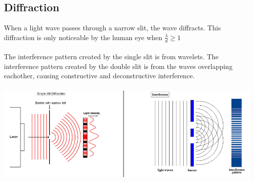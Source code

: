\documentclass{article}
\begin{document}
\subsection{Diffraction}
When a light wave passes through a narrow slit, the wave diffracts. This diffraction is only noticeable by the human eye when $\frac{\lambda}{d} \geq 1$ \\\\
The interference pattern created by the single slit is from wavelets. The interference pattern created by the double slit is from the waves overlapping eachother, causing constructive and deconstructive interference. \\\\
\includegraphics[scale=0.4]{images/slit_diffraction} \\
\end{document}
